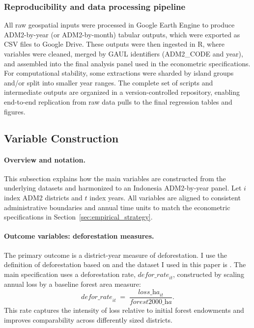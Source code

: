 \documentclass[hidelinks,12pt]{article}
\begin{document}
\subsubsection{Reproducibility and data processing pipeline}
All raw geospatial inputs were processed in Google Earth Engine \citep{gorelick2017gee} to produce ADM2-by-year (or ADM2-by-month) tabular outputs, which were exported as CSV files to Google Drive. These outputs were then ingested in R, where variables were cleaned, merged by GAUL identifiers (ADM2\_CODE and year), and assembled into the final analysis panel used in the econometric specifications. For computational stability, some extractions were sharded by island groups and/or split into smaller year ranges. The complete set of scripts and intermediate outputs are organized in a version-controlled repository, enabling end-to-end replication from raw data pulls to the final regression tables and figures.


\subsection{Variable Construction}
\label{sec:variables}



\paragraph{Overview and notation.}
This subsection explains how the main variables are constructed from the underlying datasets and harmonized to an Indonesia ADM2-by-year panel. Let $i$ index ADM2 districts and $t$ index years. All variables are aligned to consistent administrative boundaries and annual time units to match the econometric specifications in Section~\ref{sec:empirical_strategy}.

\paragraph{Outcome variables: deforestation measures.}
The primary outcome is a district-year measure of deforestation. I use the definition of deforestation based on \citep{hansen2013gfc} and the dataset I used in this paper is \citep{hansen2024gfc_v112_gee}. The main specification uses a deforestation rate, $\textit{defor\_rate}_{it}$, constructed by scaling annual loss by a baseline forest area measure:
\begin{equation}
  \textit{defor\_rate}_{it} \;=\; \frac{\textit{loss\_ha}_{it}}{\textit{forest2000\_ha}}.
\end{equation}
This rate captures the intensity of loss relative to initial forest endowments and improves comparability across differently sized districts.
\end{document}
